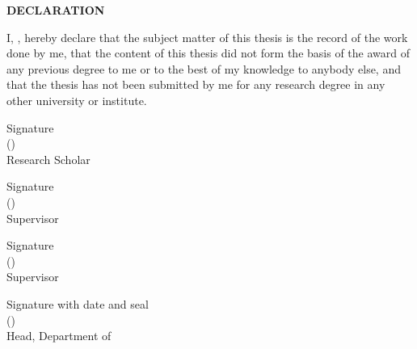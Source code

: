 \begin{titlepage}
    \begin{center}
        {\bf \large DECLARATION}
    \end{center}
    
    \par
    I, \authorname, hereby declare that the subject matter of this thesis is the record of the work done by me, that the content of this thesis did not form the basis of the award of any previous degree to me or to the best of my knowledge to anybody else, and that the thesis has not been submitted by me for any research degree in any other university or institute.
    
    \vspace*{18mm}
    \begin{flushleft}
        Signature\\
        (\authorname)\\
        Research Scholar
    \end{flushleft}
    
    \vspace*{18mm}
    \begin{flushleft}
        Signature\\
        (\supervisor)\\
        Supervisor
    \end{flushleft}
    
    \vspace*{18mm}
    \begin{flushleft}
        Signature\\
        (\cosupervisor)\\
        Supervisor
    \end{flushleft}
    
    \vspace*{18mm}
    \begin{flushleft}
        Signature with date and seal\\
        (\headofdepartment)\\
        Head, Department of \department
    \end{flushleft}
\end{titlepage}
